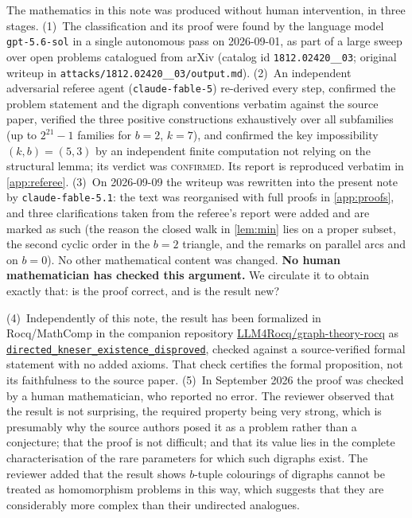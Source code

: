 \documentclass[11pt,a4paper]{article}
\theoremstyle{plain}
\theoremstyle{definition}
\theoremstyle{remark}
\begin{document}
The mathematics in this note was produced without human intervention, in three stages.
(1)~The classification and its proof were found by the language model \texttt{gpt-5.6-sol} in a single autonomous pass on 2026-09-01, as part of a large sweep over open problems catalogued from arXiv (catalog id \texttt{1812.02420\_\_03}; original writeup in \texttt{attacks/1812.02420\_\_03/output.md}).
(2)~An independent adversarial referee agent (\texttt{claude-fable-5}) re-derived every step, confirmed the problem statement and the digraph conventions verbatim against the source paper, verified the three positive constructions exhaustively over all subfamilies (up to $2^{21}-1$ families for $b=2$, $k=7$), and confirmed the key impossibility $(k,b)=(5,3)$ by an independent finite computation not relying on the structural lemma; its verdict was \textsc{confirmed}. Its report is reproduced verbatim in \cref{app:referee}.
(3)~On 2026-09-09 the writeup was rewritten into the present note by \texttt{claude-fable-5.1}: the text was reorganised with full proofs in \cref{app:proofs}, and three clarifications taken from the referee's report were added and are marked as such (the reason the closed walk in \cref{lem:min} lies on a proper subset, the second cyclic order in the $b=2$ triangle, and the remarks on parallel arcs and on $b=0$). No other mathematical content was changed.
\textbf{No human mathematician has checked this argument.} We circulate it to obtain exactly that: is the proof correct, and is the result new?

 (4)~Independently of this note, the result has been formalized in Rocq/MathComp in the companion repository \href{https://github.com/LLM4Rocq/graph-theory-rocq}{LLM4Rocq/graph-theory-rocq} as \href{https://github.com/LLM4Rocq/graph-theory-rocq/blob/main/digraph-theory/theories/applications/directed_kneser_nonexistence.v}{\texttt{directed\_kneser\_existence\_disproved}}, checked against a source-verified formal statement with no added axioms. That check certifies the formal proposition, not its faithfulness to the source paper.
 (5)~In September 2026 the proof was checked by a human mathematician, who reported no error. The reviewer observed that the result is not surprising, the required property being very strong, which is presumably why the source authors posed it as a problem rather than a conjecture; that the proof is not difficult; and that its value lies in the complete characterisation of the rare parameters for which such digraphs exist. The reviewer added that the result shows $b$-tuple colourings of digraphs cannot be treated as homomorphism problems in this way, which suggests that they are considerably more complex than their undirected analogues.
\end{document}
